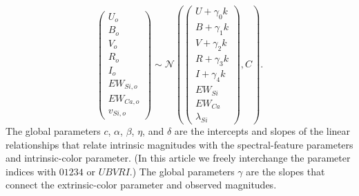 \documentclass{aastex61}   	%
\begin{document}
\begin{equation}
\begin{pmatrix}
U_o\\B_o\\ V_o\\R_o\\I_o\\EW_{Si, o}\\ EW_{Ca, o} \\ v_{Si, o}
\end{pmatrix}
\sim \mathcal{N}
\left(
\begin{pmatrix}
U +\gamma_0 k \\B +\gamma_1 k \\V+\gamma_2 k\\R+\gamma_3 k\\I+\gamma_4 k\\
EW_{Si}\\ EW_{Ca} \\ \lambda_{Si}
\end{pmatrix}
,C
\right).
\label{dust:eqn}
\end{equation}
The global parameters $c$, $\alpha$, $\beta$, $\eta$, and $\delta$  are the intercepts and slopes of the linear relationships that
relate intrinsic magnitudes with the spectral-feature parameters and intrinsic-color parameter.
(In this article we freely interchange the parameter indices with  $01234$ or $UBVRI$.)
The global parameters $\gamma$ are the slopes that connect the extrinsic-color
parameter and observed magnitudes.
\end{document}
